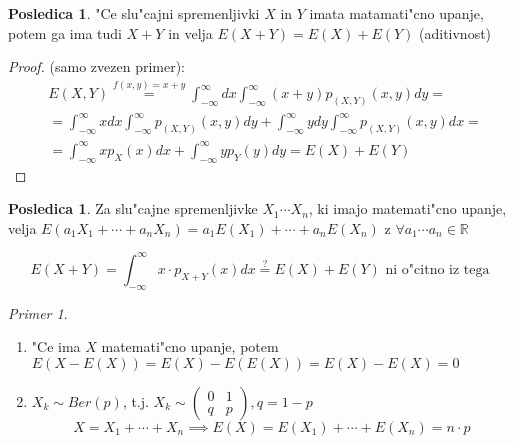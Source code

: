 \documentclass[a4paper,12pt]{article}
\theoremstyle{definition}
\newtheorem{conseq}[counter]{Posledica}
\theoremstyle{remark}
\newtheorem*{ex}{Primer}
\newcommand{\R}{\mathbb{R}}
\begin{document}
\begin{conseq}
    "Ce slu"cajni spremenljivki $X$ in $Y$ imata matamati"cno upanje, potem ga ima tudi $X+Y$ in velja $E(X+Y) = E(X) + E(Y)$
    (aditivnost)
\end{conseq}

\begin{proof}
    (samo zvezen primer): \\
    \begin{align*}
        &E(X,Y) \stackrel{f(x,y)=x+y}{=} \int_{-\infty}^{\infty} dx \int_{-\infty}^{\infty} (x+y) p_{(X,Y)}(x,y) dy =\\
        &= \int_{-\infty}^{\infty} x dx \int_{-\infty}^{\infty}p_{(X,Y)}(x,y) dy +
        \int_{-\infty}^{\infty} y dy \int_{-\infty}^{\infty}p_{(X,Y)}(x,y) dx =\\
        &= \int_{-\infty}^{\infty} x p_X(x) dx + \int_{-\infty}^{\infty} y p_{Y}(y) dy = E(X) + E(Y)
    \end{align*}
\end{proof}

\begin{conseq}
    Za slu"cajne spremenljivke $X_1 \cdots X_n$, ki imajo matemati"cno upanje, velja $E(a_1 X_1 + \cdots + a_n X_n) =
    a_1 E(X_1) + \cdots + a_n E(X_n)$ z $\forall a_1 \cdots a_n \in \R$
\end{conseq}

\begin{equation*}
    E(X+Y) = \int_{-\infty}^{\infty} x \cdot p_{X+Y}(x) dx \stackrel{\text{?}}{=} E(X) + E(Y) \text{ ni o"citno iz tega}
\end{equation*}

\begin{ex}
    \begin{enumerate}
        \item "Ce ima $X$ matemati"cno upanje, potem $E(X-E(X)) = E(X) - E(E(X)) = E(X) - E(X) = 0$
        \item $X_k \sim Ber(p)$, t.j. $X_k \sim \begin{pmatrix}0 & 1 \\ q & p\end{pmatrix}, q = 1 - p$
            \begin{equation*}
                X = X_1 + \cdots + X_n \implies E(X) = E(X_1) + \cdots + E(X_n) = n \cdot p
            \end{equation*}
    \end{enumerate}
\end{ex}
\end{document}
